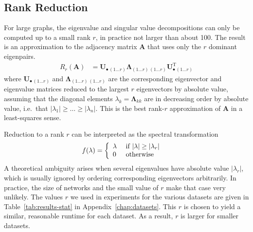 \documentclass[11pt,a4paper]{book}
\newcommand{\syRank}{r}
\begin{document}
\subsection{Rank Reduction}
\label{sec:rank-reduction}
For large graphs, the eigenvalue and singular value decompositions can
only be computed up to a small rank $\syRank$, in practice not larger than about
100.  The result is an approximation to the adjacency matrix $\mathbf A$
that uses only the $\syRank$ dominant eigenpairs. 
\begin{align}
  R_\syRank (\mathbf A) &= \mathbf U_{\bullet\,(1\ldots\syRank)}^{\phantom{\mathrm I}}
  \mathbf \Lambda_{(1\ldots\syRank)\,(1\ldots\syRank)}^{\phantom{\mathrm
      I}} \mathbf U_{\bullet\,(1\ldots\syRank)}^{\mathrm T}  
  \label{eq:rank-reduction}
\end{align}
where $\mathbf U_{\bullet\,(1\ldots\syRank)}$ and $\mathbf
\Lambda_{(1\ldots\syRank)\,(1\ldots\syRank)}$ are the 
corresponding eigenvector and eigenvalue 
matrices reduced to the largest $\syRank$ eigenvectors by absolute value,
assuming that the diagonal elements $\lambda_k = \mathbf \Lambda_{kk}$
are in 
decreasing order by absolute value, i.e.\ that $|\lambda_1| \geq \ldots
\geq |\lambda_n| $.  
This is the best rank-$\syRank$ approximation of $\mathbf A$ in a
least-squares sense.   

Reduction to a rank $\syRank$ can be interpreted as the spectral
transformation
\begin{align*}
  f(\lambda) &= \left\{ \begin{array}{ll} \lambda & \textnormal{ if }
    |\lambda| \geq |\lambda_\syRank| \\ 0 & \textnormal{ otherwise }
  \end{array} \right. 
\end{align*}
A theoretical ambiguity arises when several
eigenvalues have absolute value $|\lambda_\syRank|$, which is usually ignored
by ordering corresponding eigenvectors arbitrarily.  In practice, the
size of networks and the small value of $\syRank$ make that case very
unlikely. 
The values $\syRank$ we used in experiments for the various datasets are given
in Table~\ref{tab:results-stat} in Appendix~\ref{chap:datasets}.   
This $\syRank$ is chosen to yield a similar, reasonable runtime for each
dataset.  As a result, $\syRank$ is larger for smaller datasets. 
\end{document}

